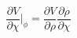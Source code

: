 \begin{equation}
\frac{\partial V} {\partial \chi}|_{\phi} = \frac{\partial V} {\partial
\rho} \frac{\partial \rho} {\partial \chi}
\end{equation}


